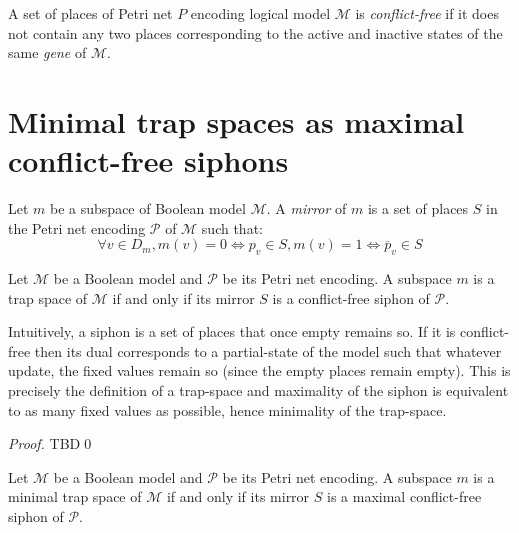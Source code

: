 \documentclass[runningheads]{llncs}
\begin{document}
\begin{definition}

  A set of places of Petri net \(P\) encoding logical model \(\mathcal{M}\) is \emph{conflict-free} if it does not contain any two places corresponding to the active and inactive states of the same \emph{gene} of \(\mathcal{M}\).

\end{definition}

\section{Minimal trap spaces as maximal conflict-free siphons}

\begin{definition}

  Let \(m\) be a subspace of Boolean model \(\mathcal{M}\). A \emph{mirror} of $m$ is a set of places $S$ in the Petri net encoding \(\mathcal{P}\) of \(\mathcal{M}\) such that:
  \[\forall v \in D_m, m(v) = 0 \Leftrightarrow p_v \in S, m(v) = 1 \Leftrightarrow \overline{p}_v \in S\]

\end{definition}

\begin{theorem}

  Let \(\mathcal{M}\) be a Boolean model and \(\mathcal{P}\) be its Petri net encoding. A subspace \(m\) is a trap space of \(\mathcal{M}\) if and only if its mirror \(S\) is a conflict-free siphon of \(\mathcal{P}\).

\end{theorem}

Intuitively, a siphon is a set of places that once empty remains so.
If it is conflict-free then its dual corresponds to a partial-state of the model such that whatever update, the fixed values remain so (since the empty places remain empty).
This is precisely the definition of a trap-space and maximality of the siphon is equivalent to as many fixed values as possible, hence minimality of the trap-space.

\begin{proof}

  TBD\qed

\end{proof}

\begin{theorem}
\label{theo:min_ts_max_sp}

  Let \(\mathcal{M}\) be a Boolean model and \(\mathcal{P}\) be its Petri net encoding. A subspace \(m\) is a minimal trap space of \(\mathcal{M}\) if and only if its mirror \(S\) is a maximal conflict-free siphon of \(\mathcal{P}\).

\end{theorem}
\end{document}
